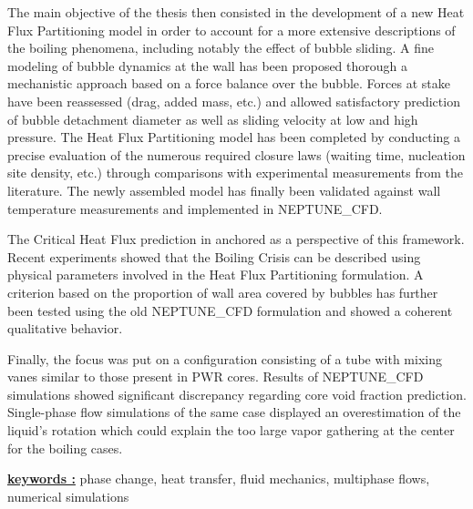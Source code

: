 \npar

The main objective of the thesis then consisted in the development of a new Heat Flux Partitioning model in order to account for a more extensive descriptions of the boiling phenomena, including notably the effect of bubble sliding. A fine modeling of bubble dynamics at the wall has been proposed thorough a mechanistic approach based on a force balance over the bubble. Forces at stake have been reassessed (drag, added mass, etc.) and allowed satisfactory prediction of bubble detachment diameter as well as sliding velocity at low and high pressure. The Heat Flux Partitioning model has been completed by conducting a precise evaluation of the numerous required closure laws (waiting time, nucleation site density, etc.) through comparisons with experimental measurements from the literature. The newly assembled model has finally been validated against wall temperature measurements and implemented in NEPTUNE\_CFD.

\npar

The Critical Heat Flux prediction in anchored as a perspective of this framework. Recent experiments showed that the Boiling Crisis can be described using physical parameters involved in the Heat Flux Partitioning formulation. A criterion based on the proportion of wall area covered by bubbles has further been tested using the old NEPTUNE\_CFD formulation and showed a coherent qualitative behavior.

\npar

Finally, the focus was put on a configuration consisting of a tube with mixing vanes similar to those present in PWR cores. Results of NEPTUNE\_CFD simulations showed significant discrepancy regarding core void fraction prediction. Single-phase flow simulations of the same case displayed an overestimation of the liquid’s rotation which could explain the too large vapor gathering at the center for the boiling cases. 

\endgroup		

\npar

\npar

\textbf{\underline{keywords :}} phase change, heat transfer, fluid mechanics, multiphase flows, numerical simulations

\vfill